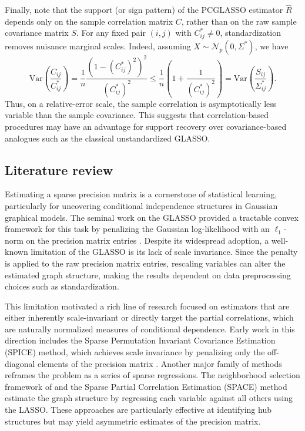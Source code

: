 \documentclass[12pt]{amsart}
\numberwithin{equation}{section}
\numberwithin{equation}{section}
\theoremstyle{plain}
\theoremstyle{definition}
\begin{document}
Finally, note that the support (or sign pattern) of the PCGLASSO estimator \(\hat{R}\) depends only on the sample correlation matrix \(C\), rather than on the raw sample covariance matrix \(S\). For any fixed pair \((i,j)\) with \(C_{ij}^\ast \neq 0\), standardization removes nuisance marginal scales. Indeed, assuming \(X \sim \mathcal{N}_p(0,\Sigma^\ast)\), we have
\[
\mathrm{Var}\left( \frac{C_{ij}}{C_{ij}^\ast}\right) = 
\frac{1}{n} \frac{(1-(C_{ij}^\ast)^2)^2}{(C_{ij}^\ast)^2} \leq  \frac{1}{n}\left(1+\frac{1}{(C_{ij}^\ast)^2}\right)  = \mathrm{Var}\left( \frac{S_{ij}}{\Sigma^\ast_{ij}}\right).
\]
Thus, on a relative-error scale, the sample correlation is asymptotically less variable than the sample covariance. This suggests that correlation-based procedures may have an advantage for support recovery over covariance-based analogues such as the classical unstandardized GLASSO.




\subsection{Literature review}

Estimating a sparse precision matrix is a cornerstone of statistical learning, particularly for uncovering conditional independence structures in Gaussian graphical models. The seminal work on the GLASSO provided a tractable convex framework for this task by penalizing the Gaussian log-likelihood with an $\ell_1$-norm on the precision matrix entries \cite{friedman2008sparse, YuanLi07}. Despite its widespread adoption, a well-known limitation of the GLASSO is its lack of scale invariance. Since the penalty is applied to the raw precision matrix entries, rescaling variables can alter the estimated graph structure, making the results dependent on data preprocessing choices such as standardization.

This limitation motivated a rich line of research focused on estimators that are either inherently scale-invariant or directly target the partial correlations, which are naturally normalized measures of conditional dependence. Early work in this direction includes the Sparse Permutation Invariant Covariance Estimation (SPICE) method, which achieves scale invariance by penalizing only the off-diagonal elements of the precision matrix \cite{SPICE08}. Another major family of methods reframes the problem as a series of sparse regressions. The neighborhood selection framework of  \cite{meinshausen2006high} and the Sparse Partial Correlation Estimation (SPACE) method \cite{SPACE09} estimate the graph structure by regressing each variable against all others using the LASSO. These approaches are particularly effective at identifying hub structures but may yield asymmetric estimates of the precision matrix.
\end{document}
